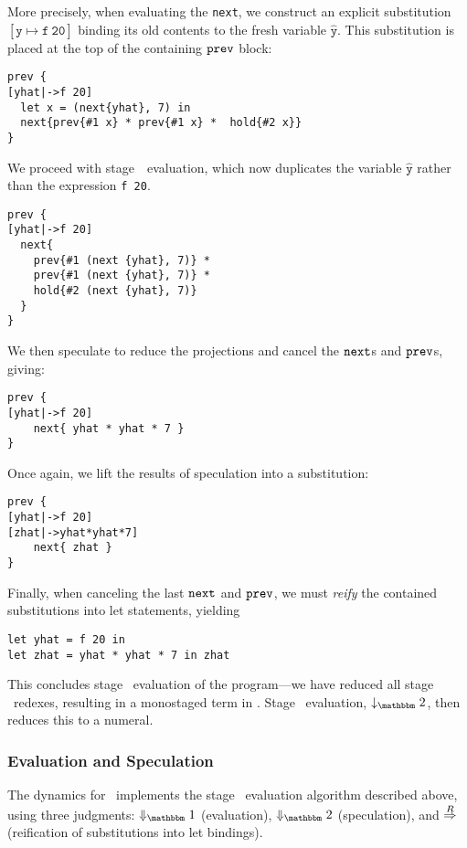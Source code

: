 More precisely, when evaluating the \verb|next|, we construct an explicit
substitution $\mathtt{[\hat y\mapsto f~20]}$ binding its old contents to the
fresh variable $\mathtt{\hat y}$. This substitution is placed at the top of the
containing ${\tt prev}$ block:
\begin{lstlisting} 
prev {
[yhat|->f 20]
  let x = (next{yhat}, 7) in
  next{prev{#1 x} * prev{#1 x} *  hold{#2 x}}
}
\end{lstlisting}
We proceed with stage~\bbone\ evaluation, which now duplicates the variable
$\mathtt{\hat y}$ rather than the expression \verb|f 20|.
\begin{lstlisting} 
prev {
[yhat|->f 20]
  next{
    prev{#1 (next {yhat}, 7)} * 
    prev{#1 (next {yhat}, 7)} *
    hold{#2 (next {yhat}, 7)}
  }
}
\end{lstlisting}
We then speculate to reduce the projections and cancel the ${\tt next}$s and ${\tt prev}$s, giving:
\begin{lstlisting} 
prev {
[yhat|->f 20]
    next{ yhat * yhat * 7 }
}
\end{lstlisting}
Once again, we lift the results of speculation into a substitution:
\begin{lstlisting} 
prev {
[yhat|->f 20]
[zhat|->yhat*yhat*7]
    next{ zhat }
}
\end{lstlisting}
Finally, when canceling the last ${\tt next}$ and ${\tt prev}$, we must {\em reify} the contained substitutions into let statements, yielding
\begin{lstlisting} 
let yhat = f 20 in
let zhat = yhat * yhat * 7 in zhat
\end{lstlisting}

This concludes stage \bbone\ evaluation of the program---we have reduced all
stage \bbone\ redexes, resulting in a monostaged term in \langTwo. Stage \bbtwo\
evaluation, $\tworedsym$, then reduces this to a numeral.

\subsubsection{Evaluation and Speculation}
\label{ssec:dynamics}



The dynamics for \lang\ implements the stage \bbone\ evaluation algorithm
described above, using three judgments: $\redonesym$ (evaluation), $\redtwosym$
(speculation), and $\overset{R}\Rightarrow$ (reification of substitutions into let
bindings).

